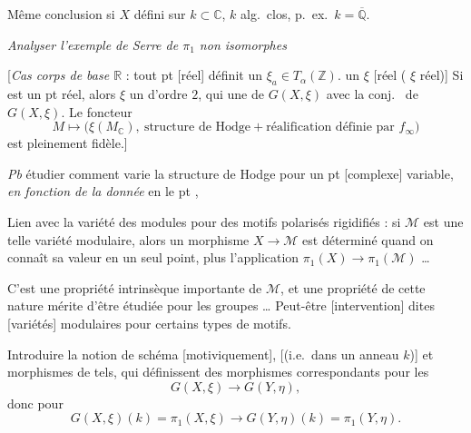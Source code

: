 \documentclass[11pt,a4paper]{article}
\begin{document}
Même conclusion si $X$ défini sur $k \subset \mathbb{C}$, $k$ alg.\ clos,
p.\ ex.\ $k = \overline{\mathbb{Q}}$.

\emph{Analyser l'exemple de Serre de $\pi_1$ non isomorphes}

[\emph{Cas corps de base $\mathbb{R}$} : tout pt \struck{\ill{}} [réel]
définit un $\xi_a \in T_\alpha(\mathbb{Z})$. \ill{} un $\xi$
 [réel (\ill{} \ill{} $\xi$ \ill{} réel)]
Si \ill{} est un pt réel, alors $\xi$ \ill{} un \ill{} 
d'ordre $2$, qui \ill{} une  \ill{} de $G(X,\xi)$
 avec la conj.\  de $G(X,\xi)$. Le
foncteur
\[
  M \mapsto \bigl(\xi(M_{\mathbb{C}}),\ \text{structure de Hodge} +
  \text{réalification définie par } f_\infty\bigr)
\]
est pleinement fidèle.]



\emph{Pb} étudier comment varie la structure de Hodge pour un pt [complexe]
variable, \emph{en fonction de la donnée}  en le pt
\uncertain{$\infty$},

Lien avec la variété des modules pour des motifs polarisés rigidifiés : si
$\mathcal{M}$ est une telle variété modulaire, alors un morphisme $X \to
\mathcal{M}$ est déterminé quand on connaît sa valeur en un seul point,
plus l'application $\pi_1(X) \to \pi_1(\mathcal{M})$ …

C'est une propriété intrinsèque importante de $\mathcal{M}$, et une
propriété de cette nature mérite d'être étudiée pour les groupes
 … Peut-être  \uncertain{\ill{}}
\struck{\ill{}} [intervention] \ill{} dites \struck{\ill{}} [variétés]
modulaires pour certains types de motifs.

Introduire la notion de schéma  [motiviquement], [(i.e.\ 
dans un anneau $k$)] et morphismes de tels, qui définissent des morphismes
correspondants pour les
\[
  G(X,\xi) \to G(Y,\eta),
\]
donc pour
\[
  G(X,\xi)(k) = \pi_1(X,\xi) \to G(Y,\eta)(k) = \pi_1(Y,\eta) .
\]
\end{document}
